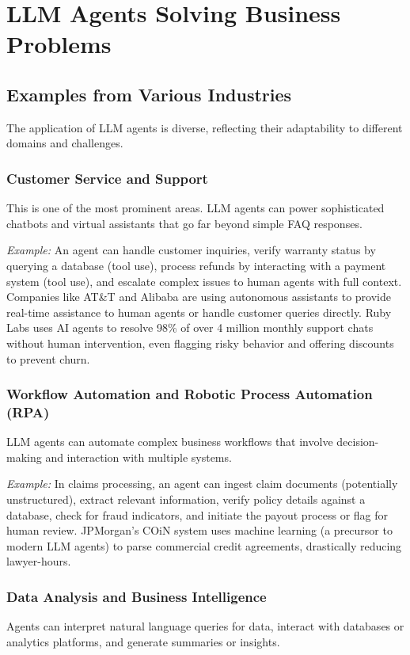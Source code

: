 \chapter{LLM Agents Solving Business Problems}
\section{Examples from Various Industries}
The application of LLM agents is diverse, reflecting their adaptability to different domains and challenges.

\subsection{Customer Service and Support}
This is one of the most prominent areas. LLM agents can power sophisticated chatbots and virtual assistants that go far beyond simple FAQ responses.

\textit{Example:} An agent can handle customer inquiries, verify warranty status by querying a database (tool use), process refunds by interacting with a payment system (tool use), and escalate complex issues to human agents with full context. Companies like AT\&T and Alibaba are using autonomous assistants to provide real-time assistance to human agents or handle customer queries directly. Ruby Labs uses AI agents to resolve 98\% of over 4 million monthly support chats without human intervention, even flagging risky behavior and offering discounts to prevent churn.

\subsection{Workflow Automation and Robotic Process Automation (RPA)}
LLM agents can automate complex business workflows that involve decision-making and interaction with multiple systems.

\textit{Example:} In claims processing, an agent can ingest claim documents (potentially unstructured), extract relevant information, verify policy details against a database, check for fraud indicators, and initiate the payout process or flag for human review. JPMorgan's COiN system uses machine learning (a precursor to modern LLM agents) to parse commercial credit agreements, drastically reducing lawyer-hours.

\subsection{Data Analysis and Business Intelligence}
Agents can interpret natural language queries for data, interact with databases or analytics platforms, and generate summaries or insights.

